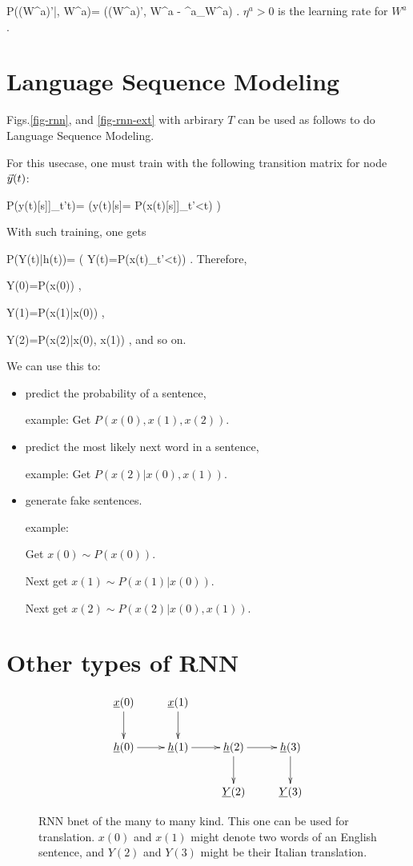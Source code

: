 \beq\color{blue}
P((W^a)'|\cale, W^a)=
\delta((W^a)', W^a -
\eta ^a\partial_{W^a}\cale)
\;.
\eeq
$\eta ^a>0$ is the learning rate
for $W^a$.

\section*{Language Sequence Modeling}

Figs.\ref{fig-rnn}, and \ref{fig-rnn-ext}
with arbirary $T$ can be used 
as follows to do
Language Sequence Modeling.

For this usecase, one must
train with the following
transition matrix for node ${\vec{y}}(t)$:

\beq\color{blue}
P(y(t)[s]\cond [x(t)[s]]_{t'\leq t})=
\indi(\;\;\;y(t)[s]=
P(x(t)[s]\cond [x(t')[s]]_{t'<t})
\;\;\;)
\eeq

With such training, one gets

\beq
P(Y(t)|h(t))=
\indi(\;\;\;
Y(t)=P(x(t)\cond [x(t')]_{t'<t})\;\;\;)
\;.
\eeq
Therefore,

\beq
Y(0)=P(x(0))
\;,
\eeq

\beq
Y(1)=P(x(1)|x(0))
\;,
\eeq

\beq
Y(2)=P(x(2)|x(0), x(1))
\;,
\eeq
and so on.

We can use this to: 
\begin{itemize}
\item
predict the probability 
of a sentence,

example: Get $P(x(0), x(1), x(2))$.
\item
predict 
the most likely 
next word in a sentence,

example: Get $P(x(2)| x(0), x(1))$.
\item generate fake sentences.

example: 

Get $x(0)\sim P(x(0))$.

Next get $x(1)\sim P(x(1)|x(0))$.

Next get $x(2)\sim P(x(2)|x(0), x(1))$.


\end{itemize}

 
\section*{Other types of RNN}

\begin{figure}[h!]
\centering
$$\xymatrix{
\rvx(0)\ar[d]&
\rvx(1)\ar[d]&
\\
\rvh(0)\ar[r]&
\rvh(1)\ar[r]&
\rvh(2)\ar[d]\ar[r]&
\rvh(3)\ar[d]\\
&
&
\rvY(2)&
\rvY(3)
}$$
\caption{RNN bnet of the
many to many kind. This
one can be used for  translation.
$x(0)$ and $x(1)$ might
denote two words of an English
sentence, and $Y(2)$ 
and $Y(3)$ might be
their Italian translation.}
\label{fig-rnn-translation}
\end{figure}

